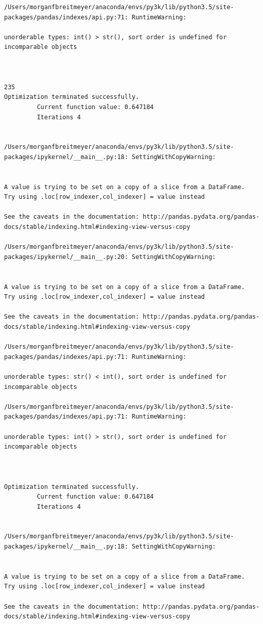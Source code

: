 \begin{lstlisting}
/Users/morganfbreitmeyer/anaconda/envs/py3k/lib/python3.5/site-packages/pandas/indexes/api.py:71: RuntimeWarning:

unorderable types: int() > str(), sort order is undefined for incomparable objects



235
Optimization terminated successfully.
         Current function value: 0.647184
         Iterations 4


/Users/morganfbreitmeyer/anaconda/envs/py3k/lib/python3.5/site-packages/ipykernel/__main__.py:18: SettingWithCopyWarning:


A value is trying to be set on a copy of a slice from a DataFrame.
Try using .loc[row_indexer,col_indexer] = value instead

See the caveats in the documentation: http://pandas.pydata.org/pandas-docs/stable/indexing.html#indexing-view-versus-copy

/Users/morganfbreitmeyer/anaconda/envs/py3k/lib/python3.5/site-packages/ipykernel/__main__.py:20: SettingWithCopyWarning:


A value is trying to be set on a copy of a slice from a DataFrame.
Try using .loc[row_indexer,col_indexer] = value instead

See the caveats in the documentation: http://pandas.pydata.org/pandas-docs/stable/indexing.html#indexing-view-versus-copy

/Users/morganfbreitmeyer/anaconda/envs/py3k/lib/python3.5/site-packages/pandas/indexes/api.py:71: RuntimeWarning:

unorderable types: str() < int(), sort order is undefined for incomparable objects

/Users/morganfbreitmeyer/anaconda/envs/py3k/lib/python3.5/site-packages/pandas/indexes/api.py:71: RuntimeWarning:

unorderable types: int() > str(), sort order is undefined for incomparable objects



Optimization terminated successfully.
         Current function value: 0.647184
         Iterations 4


/Users/morganfbreitmeyer/anaconda/envs/py3k/lib/python3.5/site-packages/ipykernel/__main__.py:18: SettingWithCopyWarning:


A value is trying to be set on a copy of a slice from a DataFrame.
Try using .loc[row_indexer,col_indexer] = value instead

See the caveats in the documentation: http://pandas.pydata.org/pandas-docs/stable/indexing.html#indexing-view-versus-copy


\end{lstlisting}
